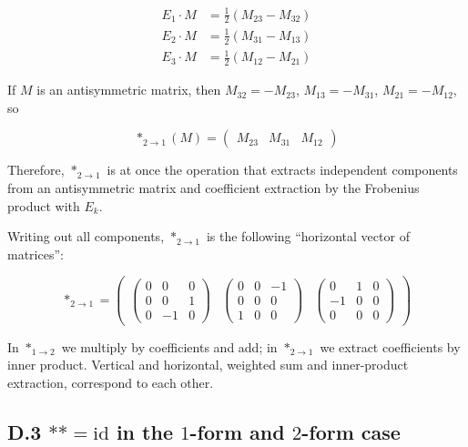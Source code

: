 \[
\begin{aligned}
E_1 \cdot M &= \frac{1}{2}(M_{23}-M_{32}) \\
E_2 \cdot M &= \frac{1}{2}(M_{31}-M_{13}) \\
E_3 \cdot M &= \frac{1}{2}(M_{12}-M_{21})
\end{aligned}
\]

If \(M\) is an antisymmetric matrix, then \(M_{32}=-M_{23}\),
\(M_{13}=-M_{31}\), \(M_{21}=-M_{12}\), so

\[
\ast_{2\to1}(M)
=
\begin{pmatrix}
M_{23} & M_{31} & M_{12}
\end{pmatrix}
\]

Therefore, \(\ast_{2\to1}\) is at once the operation that extracts
independent components from an antisymmetric matrix and coefficient
extraction by the Frobenius product with \(E_k\).

Writing out all components, \(\ast_{2\to1}\) is the following
``horizontal vector of matrices'':

\[
\ast_{2\to1} = \begin{pmatrix}
\begin{pmatrix} 0 & 0 & 0 \\ 0 & 0 & 1 \\ 0 & -1 & 0 \end{pmatrix} &
\begin{pmatrix} 0 & 0 & -1 \\ 0 & 0 & 0 \\ 1 & 0 & 0 \end{pmatrix} &
\begin{pmatrix} 0 & 1 & 0 \\ -1 & 0 & 0 \\ 0 & 0 & 0 \end{pmatrix}
\end{pmatrix}
\]

In \(\ast_{1\to2}\) we multiply by coefficients and add; in
\(\ast_{2\to1}\) we extract coefficients by inner product. Vertical and
horizontal, weighted sum and inner-product extraction, correspond to
each other.

\hypertarget{d.3-astastmathrmid-in-the-1-form-and-2-form-case}{%
\subsection{\texorpdfstring{D.3 \(\ast\ast=\mathrm{id}\) in the
\(1\)-form and \(2\)-form
case}{D.3 \textbackslash ast\textbackslash ast=\textbackslash mathrm\{id\} in the 1-form and 2-form case}}\label{d.3-astastmathrmid-in-the-1-form-and-2-form-case}}

